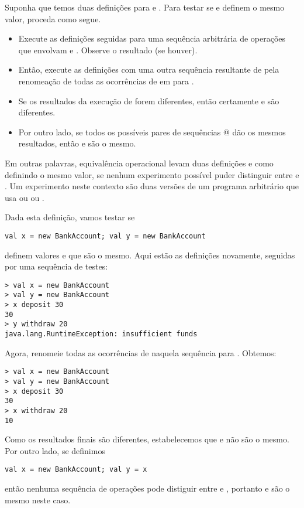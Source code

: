 Suponha que temos duas definições para  e . Para testar se  e  definem o mesmo 
valor, proceda como segue.
\begin{itemize}
\item
Execute as definições seguidas para uma sequência arbitrária  de operações que envolvam  e 
. Observe o resultado (se houver).
\item
Então, execute as definições com uma outra sequência  resultante de  pela renomeação de 
todas as ocorrências de  em  para . 
\item
Se os resultados da execução de  forem diferentes, então certamente  e  são diferentes. 
\item
Por outro lado, se todos os possíveis pares de sequências @ dão os mesmos resultados, então
 e  são o mesmo.
\end{itemize}
Em outras palavras, equivalência operacional levam duas definições  e  como definindo o mesmo 
valor, se nenhum experimento possível puder distinguir entre  e . Um experimento neste contexto
são duas versões de um programa arbitrário que usa ou  ou .
 
Dada esta definição, vamos testar se
\begin{lstlisting}
val x = new BankAccount; val y = new BankAccount
\end{lstlisting}
definem valores  e  que são o mesmo.
Aqui estão as definições novamente, seguidas por uma sequência de testes:

\begin{lstlisting}
> val x = new BankAccount
> val y = new BankAccount
> x deposit 30
30
> y withdraw 20
java.lang.RuntimeException: insufficient funds
\end{lstlisting}

Agora, renomeie todas as ocorrências de  naquela sequência para . Obtemos:
\begin{lstlisting}
> val x = new BankAccount
> val y = new BankAccount
> x deposit 30
30
> x withdraw 20
10
\end{lstlisting}
Como os resultados finais são diferentes, estabelecemos que  e  não são o mesmo.
Por outro lado, se definimos
\begin{lstlisting}
val x = new BankAccount; val y = x
\end{lstlisting}
então nenhuma sequência de operações pode distiguir entre  e , portanto  e  
são o mesmo neste caso.

